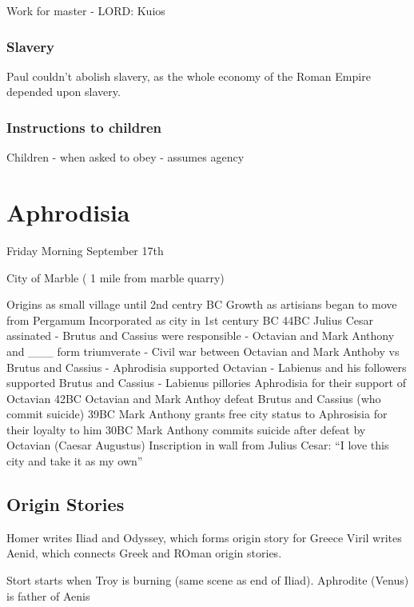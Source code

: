 \documentclass[
]{book}
\begin{document}
Work for master - LORD: Kuios

\hypertarget{slavery}{%
\subsection{Slavery}\label{slavery}}

Paul couldn't abolish slavery, as the whole economy of the Roman Empire depended upon slavery.

\hypertarget{instructions-to-children}{%
\subsection{Instructions to children}\label{instructions-to-children}}

Children - when asked to obey - assumes agency

\hypertarget{aphrodisia}{%
\chapter{Aphrodisia}\label{aphrodisia}}

Friday Morning September 17th

City of Marble ( 1 mile from marble quarry)

Origins as small village until 2nd centry BC
Growth as artisians began to move from Pergamum
Incorporated as city in 1st century BC
44BC Julius Cesar assinated
- Brutus and Cassius were responsible
- Octavian and Mark Anthony and \_\_\_ form triumverate
- Civil war between Octavian and Mark Anthoby vs Brutus and Cassius
- Aphrodisia supported Octavian
- Labienus and his followers supported Brutus and Cassius
- Labienus pillories Aphrodisia for their support of Octavian
42BC Octavian and Mark Anthoy defeat Brutus and Cassius (who commit suicide)
39BC Mark Anthony grants free city status to Aphrosisia for their loyalty to him
30BC Mark Anthony commits suicide after defeat by Octavian (Caesar Augustus)
Inscription in wall from Julius Cesar: ``I love this city and take it as my own''

\hypertarget{origin-stories}{%
\section{Origin Stories}\label{origin-stories}}

Homer writes Iliad and Odyssey, which forms origin story for Greece
Viril writes Aenid, which connects Greek and ROman origin stories.

Stort starts when Troy is burning (same scene as end of Iliad).
Aphrodite (Venus) is father of Aenis
\end{document}
